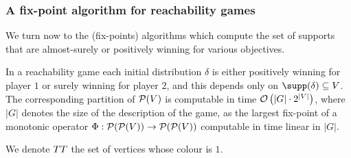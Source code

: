 \subsubsection{A fix-point algorithm for reachability games}

We turn now to the {\color{black} (fix-points)} algorithms which compute the set of supports that
are almost-surely or positively winning for various objectives.
\setcounter{theo:qdec1}{\value{theorem}}
\begin{theorem}
  \label{theo:qdec1} In a reachability game each initial distribution
  $\delta$ is either positively winning for player $1$ or surely
  winning for player $2$, and this depends only on
  $\supp(\delta)\subseteq \states$.
  The corresponding partition of $\mathcal{P}(V)$ is computable in
  time $\mathcal{O}\left(|G| \cdot 2^{|V|}\right)$, where $|G| $ denotes
  the size of the description of the game,
  as the largest fix-point of a monotonic operator
$\Phi:\mathcal{P}(\mathcal{P}(V))\to \mathcal{P}(\mathcal{P}(V))$
computable in time linear in $|G| $.
\end{theorem}

We denote $TT$ the set of vertices whose colour is $1$.

